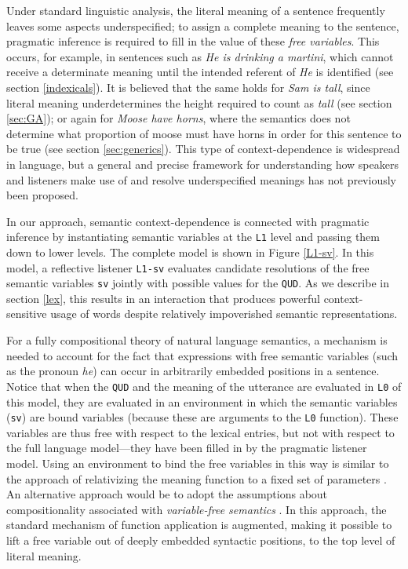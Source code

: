 \documentclass[12pt]{article}
\begin{document}
Under standard linguistic analysis, the literal meaning of a sentence frequently leaves some aspects underspecified; to assign a complete meaning to the sentence, pragmatic inference is required to fill in the value of these \emph{free variables}. This occurs, for example, in sentences such as \emph{He is drinking a martini}, which cannot receive a determinate meaning until the intended referent of \emph{He} is identified (see section \ref{indexicals}). It is believed that the same holds for \emph{Sam is tall}, since literal meaning underdetermines the height required to count as \emph{tall} (see section \ref{sec:GA}); or again for \emph{Moose have horns}, where the semantics does not determine what proportion of moose must have horns in order for this sentence to be true (see section \ref{sec:generics}). This type of context-dependence is widespread in language, but a general and precise framework for understanding how speakers and listeners make use of and resolve underspecified meanings has not previously been proposed.

In our approach, semantic context-dependence is connected with pragmatic inference by instantiating semantic variables at the \lstinline{L1} level and passing them down to lower levels. The complete model is shown in Figure \ref{L1-sv}.
In this model, a reflective listener \lstinline{L1-sv} evaluates candidate resolutions of the free semantic variables \lstinline{sv} jointly with possible values for the \lstinline{QUD}.
As we describe in section \ref{lex}, this results in an interaction that produces powerful context-sensitive usage of words despite relatively impoverished semantic representations.

For a fully compositional theory of natural language semantics, a mechanism is needed to account for the fact that expressions with free semantic variables (such as the pronoun \emph{he}) can occur in arbitrarily embedded positions in a sentence.
Notice that when the \lstinline{QUD} and the meaning of the utterance are evaluated in \lstinline{L0} of this model, they are evaluated in an environment in which the semantic variables (\lstinline{sv}) are bound variables (because these are arguments to the \lstinline{L0} function). These variables are thus free with respect to the lexical entries, but not with respect to the full language model---they have been filled in by the pragmatic listener model. Using an environment to bind the free variables in this way is similar to the approach of relativizing the meaning function to a fixed set of parameters \cite{lewis79,lewis97,barker02}.
An alternative approach would be to adopt the assumptions about compositionality associated with \emph{variable-free semantics} \citep{szabolcsi87,steedman01,jacobson99,barker07}. In this approach, the standard mechanism of function application is augmented, making it possible to lift a free variable out of deeply embedded syntactic positions, to the top level of literal meaning.
\end{document}
